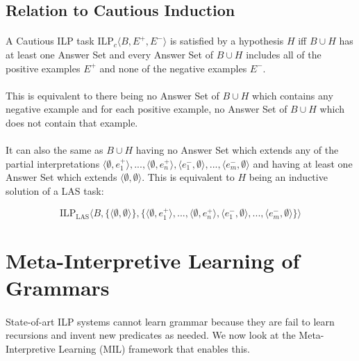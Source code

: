 \documentclass{article}
\theoremstyle{plain}
\theoremstyle{definition}
\begin{document}
\begin{multicols}{2}
\subsection{Relation to Cautious Induction}

\paragraph{} A Cautious ILP task $\text{ILP}_c\langle B, E^+, E^-\rangle$ is satisfied by a hypothesis $H$ iff $B \cup H$ has at least one Answer Set and every Answer Set of $B \cup H$ includes all of the positive examples $E^+$ and none of the negative examples $E^-$.

\paragraph{} This is equivalent to there being no Answer Set of $B \cup H$ which contains any negative example and for each positive example, no Answer Set of $B \cup H$ which does not contain that example.

\paragraph{} It can also the same as $B \cup H$ having no Answer Set which extends any of the partial interpretations $\langle \emptyset, e^+_1\rangle, ..., \langle \emptyset, e^+_n\rangle, \langle e^-_1, \emptyset\rangle, ..., \langle e^-_m, \emptyset\rangle$ and having at least one Answer Set which extends $\langle \emptyset, \emptyset \rangle$. This is equivalent to $H$ being an inductive solution of a LAS task:

$$\text{ILP}_\text{LAS} \langle B, \{\langle \emptyset, \emptyset \rangle\}, \{\langle \emptyset, e^+_1\rangle, ..., \langle \emptyset, e^+_n\rangle, \langle e^-_1, \emptyset\rangle, ..., \langle e^-_m, \emptyset\rangle\}\rangle$$

\section{Meta-Interpretive Learning of Grammars}

\paragraph{} State-of-art ILP systems cannot learn grammar because they are fail to learn recursions and invent new predicates as needed. We now look at the Meta-Interpretive Learning (MIL) framework\cite{muggleton13} that enables this.


\end{multicols}
\end{document}
